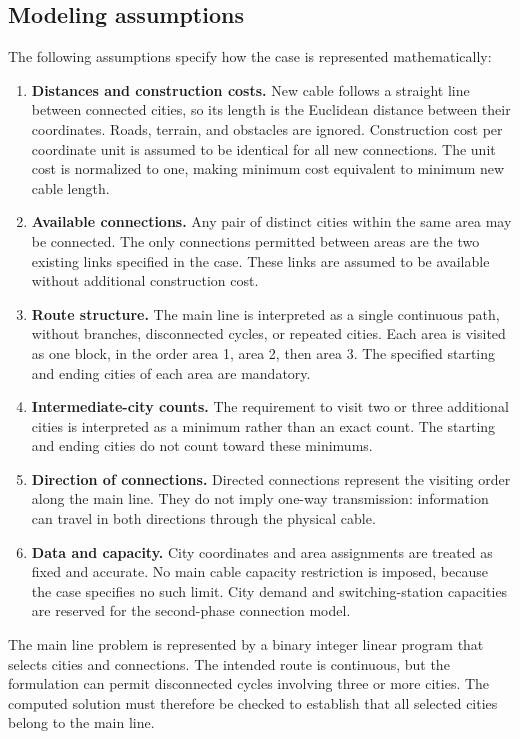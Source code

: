 \documentclass[11pt,a4paper]{article}
\begin{document}
\subsection{Modeling assumptions}
The following assumptions specify how the case is represented mathematically:
\begin{enumerate}
  \item \textbf{Distances and construction costs.} New cable follows a straight line between connected cities, so its length is the Euclidean distance between their coordinates. Roads, terrain, and obstacles are ignored. Construction cost per coordinate unit is assumed to be identical for all new connections. The unit cost is normalized to one, making minimum cost equivalent to minimum new cable length.
  \item \textbf{Available connections.} Any pair of distinct cities within the same area may be connected. The only connections permitted between areas are the two existing links specified in the case. These links are assumed to be available without additional construction cost.
  \item \textbf{Route structure.} The main line is interpreted as a single continuous path, without branches, disconnected cycles, or repeated cities. Each area is visited as one block, in the order area 1, area 2, then area 3. The specified starting and ending cities of each area are mandatory.
  \item \textbf{Intermediate-city counts.} The requirement to visit two or three additional cities is interpreted as a minimum rather than an exact count. The starting and ending cities do not count toward these minimums.
  \item \textbf{Direction of connections.} Directed connections represent the visiting order along the main line. They do not imply one-way transmission: information can travel in both directions through the physical cable.
  \item \textbf{Data and capacity.} City coordinates and area assignments are treated as fixed and accurate. No main cable capacity restriction is imposed, because the case specifies no such limit. City demand and switching-station capacities are reserved for the second-phase connection model.
\end{enumerate}

The main line problem is represented by a binary integer linear program that selects cities and connections. The intended route is continuous, but the formulation can permit disconnected cycles involving three or more cities. The computed solution must therefore be checked to establish that all selected cities belong to the main line.
\end{document}
